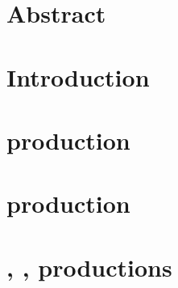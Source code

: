 

\section*{Abstract}


\section{Introduction}
\label{sec:intro}


\section{\texorpdfstring{\ttbar}{ttbar} production}

\label{sec:tt}

\section{\texorpdfstring{\tW}{tW} production} 

\label{sec:tW}

\section{\texorpdfstring{\ttgamma, \ttcc, \ttbb}{ttXX} productions}

\label{sec:ttX}

%

